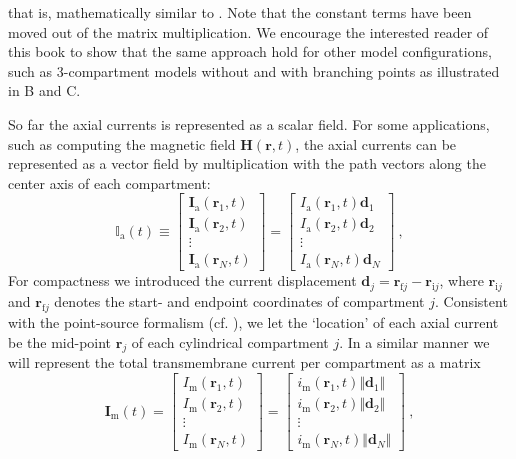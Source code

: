 %
that is, mathematically similar to . 
Note that the constant terms have been moved out of the matrix multiplication.
We encourage the interested reader of this book to show that the same approach hold for other model configurations, such
as 3-compartment models without and with branching points as illustrated in B and C.

So far the axial currents is represented as a scalar field.
For some applications, such as computing the magnetic field $\mathbf{H}(\mathbf{r}, t)$,
the axial currents can be represented as a vector field by multiplication with the path vectors along the center axis of each compartment:
%
\begin{equation}
\mathbb{I}_\mathrm{a}(t) \equiv
\begin{bmatrix}
\mathbf{I}_\mathrm{a}(\mathbf{r}_1, t)\\
\mathbf{I}_\mathrm{a}(\mathbf{r}_2, t)\\
\vdots \\
\mathbf{I}_\mathrm{a}(\mathbf{r}_N, t)
\end{bmatrix}
=
\begin{bmatrix}
I_\mathrm{a}(\mathbf{r}_1, t) \mathbf{d}_1 \\
I_\mathrm{a}(\mathbf{r}_2, t) \mathbf{d}_2 \\
\vdots \\
I_\mathrm{a}(\mathbf{r}_N, t) \mathbf{d}_N
\end{bmatrix} ~,
\end{equation}
%
For compactness we introduced the current displacement $\mathbf{d}_j=\mathbf{r}_{\mathrm{f}j} - \mathbf{r}_{\mathrm{i}j}$,
where $\mathbf{r}_{\mathrm{i}j}$ and $\mathbf{r}_{\mathrm{f}j}$ denotes the start- and endpoint coordinates of compartment $j$.
Consistent with the point-source formalism (cf. ),
we let the `location' of each axial current be the mid-point $\mathbf{r}_j$ of each cylindrical compartment $j$.
In a similar manner we will represent the total transmembrane current per compartment as a matrix
\begin{equation}
\mathbf{I}_\mathrm{m}(t) =
\begin{bmatrix}
I_\mathrm{m}(\mathbf{r}_1, t) \\
I_\mathrm{m}(\mathbf{r}_2, t) \\
\vdots \\
I_\mathrm{m}(\mathbf{r}_N, t)
\end{bmatrix}
=
\begin{bmatrix}
i_\mathrm{m}(\mathbf{r}_1, t) \Vert \mathbf{d}_1 \Vert \\
i_\mathrm{m}(\mathbf{r}_2, t) \Vert \mathbf{d}_2 \Vert \\
\vdots \\
i_\mathrm{m}(\mathbf{r}_N, t) \Vert \mathbf{d}_N \Vert
\end{bmatrix} ~,
\end{equation}
